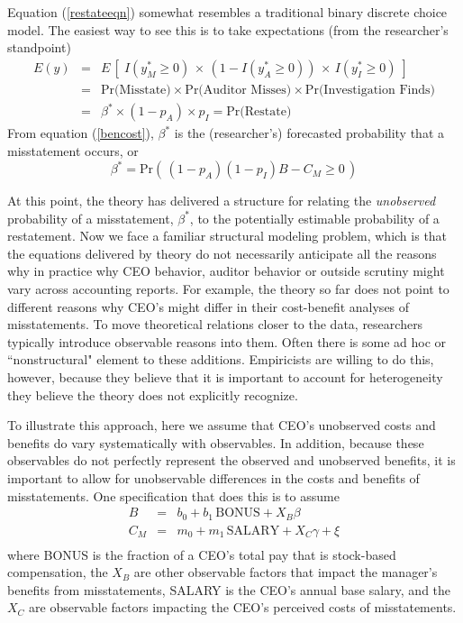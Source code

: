 Equation (\ref{restateeqn}) somewhat resembles a traditional binary discrete choice model. The easiest
way to see this is to take expectations (from the researcher's standpoint)
\begin{equation} \label{equilpr}
\begin{array}{lcl}
 E(y) & = & E\, \left[\; I(y^*_M \ge 0) \, \times\, (1 - I(y^*_A \ge 0)) \, \times\, I(y^*_I \ge 0) \; \right]\\[1em]
 & = &  \mbox{Pr(Misstate)} \times \mbox{Pr(Auditor Misses)} \times
\mbox{Pr(Investigation Finds)}\\[1em]
& = & \beta^* \times (1-p_A) \times p_{I} = \mbox{Pr(Restate)}
\end{array}\end{equation}
From equation (\ref{bencost}), $\beta^*$ is the (researcher's) forecasted probability that a misstatement occurs, or
\begin{equation}\label{betaplus}
\beta^*= \mbox{Pr}\left(\, (1 - p_A)(1 - p_I) B - C_M \ge 0 \,\right)
\end{equation}

At this point, the theory has delivered a structure for relating the \emph{unobserved} probability of a misstatement, $\beta^*$, to the potentially estimable probability of a restatement.
Now we face a familiar structural modeling problem, which is that the equations delivered by theory do not necessarily anticipate all the reasons why
in practice why CEO behavior, auditor behavior or outside scrutiny might vary across accounting reports.
For example, the theory so far does not point to different reasons why CEO's might differ in their cost-benefit analyses of misstatements. 
To move theoretical relations closer to the data, researchers typically introduce observable reasons into them. Often there is some ad hoc or ``nonstructural" element to these
additions. 
Empiricists are willing to do this, however, because they believe that it is important to account for heterogeneity they believe the theory does not explicitly recognize.

To illustrate this approach, here we assume that CEO's unobserved costs and benefits do vary systematically with observables.
In addition, because these observables do not perfectly represent the observed and unobserved benefits, it is important to allow for unobservable differences in the costs and benefits of misstatements. 
One specification that does this is to assume
\begin{equation}\begin{array}{lcl}\label{eqns1}
B & = & b_0 + b_1 \, \mbox{BONUS} + X_B\beta\\[.5em]
C_M & = & m_0 + m_1 \, \mbox{SALARY} + X_C\gamma + \xi\\[.5em]
\end{array}
\end{equation}
where BONUS is the fraction of a CEO's total pay that is stock-based compensation, 
the $X_B$ are other observable factors that impact the manager's benefits from misstatements,
SALARY is the CEO's annual base salary, and the $X_C$ are observable factors impacting the CEO's perceived costs of misstatements.

